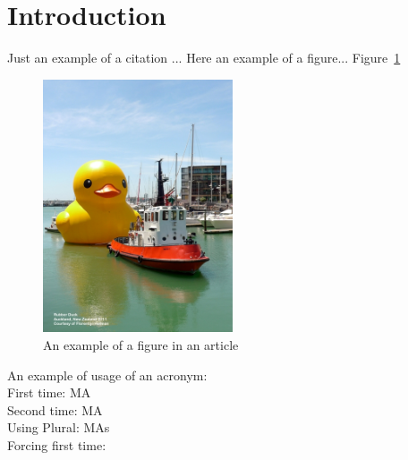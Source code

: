 
\section{Introduction}
\label{sec:introduction}
Just an example of a citation \cite{nobody}...
Here an example of a figure...
Figure~\ref{fig:example}
\begin{figure}[!ht]
  \centering
    \includegraphics[width=0.5\textwidth]{figures/rubberduck}
    \caption{An example of a figure in an article}
    \label{fig:example}
\end{figure}

An example of usage of an acronym:\\
First time: \gls{MA}\\
Second time: \gls{MA}\\
Using Plural: \glspl{MA}\\
Forcing first time: 
